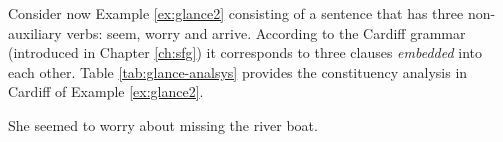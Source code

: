 Consider now Example \ref{ex:glance2} consisting of a sentence that has three non-auxiliary verbs: seem, worry and arrive. According to the Cardiff grammar (introduced in Chapter \ref{ch:sfg}) it corresponds to three clauses \textit{embedded} into each other. Table \ref{tab:glance-analsys} provides the constituency analysis in Cardiff of Example \ref{ex:glance2}.

\begin{exe}
    \ex\label{ex:glance2} She seemed to worry about missing the river boat.
\end{exe}

\begin{table}[!ht]
    \centering
    \caption{SF constituency analysis in Cardiff grammar style of Example \ref{ex:glance2}}
    \label{tab:glance-analsys}
\end{table}

